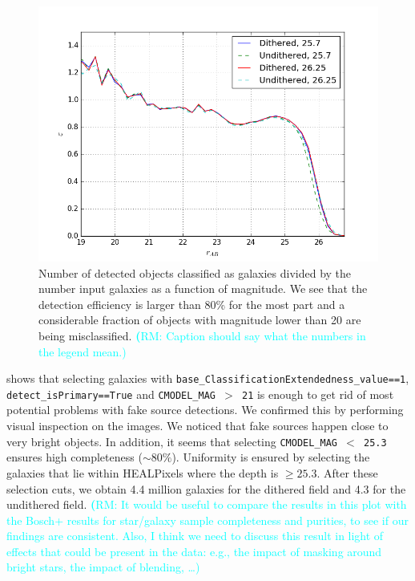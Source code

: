 \documentclass[twocolumn]{aastex62}
\newcommand{\rachel}[1]{{\textcolor{cyan}{{\textbf (RM: #1)}}}}
\begin{document}
\begin{figure}
\centering
\includegraphics[width=0.9\columnwidth]{completeness.png}
\caption{Number of detected objects classified as galaxies divided by the number input galaxies as a function of magnitude. We see that the detection efficiency is larger than 80\% for the most part and a considerable fraction of objects with magnitude lower than 20 are being misclassified. \rachel{Caption should say what the numbers in the legend mean.}}
\label{fig:completeness}
\end{figure}

 shows that selecting galaxies with \texttt{base\_ClassificationExtendedness\_value==1}, \texttt{detect\_isPrimary==True} and \texttt{CMODEL\_MAG $>$ 21} is enough to get rid of most potential problems with fake source detections. We confirmed this by performing visual inspection on the images. We noticed that fake sources happen close to very bright objects. In addition, it seems that selecting \texttt{CMODEL\_MAG $<$ 25.3} ensures high completeness ($\sim 80\%$). Uniformity is ensured by selecting the galaxies that lie within HEALPixels where the depth is $\geq 25.3$. After these selection cuts, we obtain 4.4 million galaxies for the dithered field and 4.3 for the undithered field. \rachel{It would be useful to compare the results in this plot with the Bosch+ results for star/galaxy sample completeness and purities, to see if our findings are consistent.  Also, I think we need to discuss this result in light of effects that could be present in the data: e.g., the impact of masking around bright stars, the impact of blending, \dots}
\end{document}
